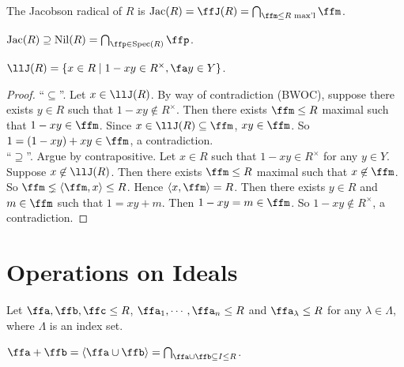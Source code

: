 \begin{definition}
    The Jacobson radical of $R$ is $\operatorname{Jac}(R) = \ffJ(R) = \bigcap_{\ffm \leq R \text{ max'l}}\ffm$.
\end{definition}

\begin{remark}
    $\operatorname{Jac}(R) \supseteq \operatorname{Nil}(R) = \bigcap_{\ffp \in \operatorname{Spec}(R)}\ffp$.
\end{remark}

\begin{proposition}
    $\llJ(R) = \{x \in R \mid 1-xy \in R^\times, \fa y \in Y\}$.
\end{proposition}

\begin{proof}
    ``$\subseteq$''. Let $x \in \llJ(R)$. By way of contradiction (BWOC), suppose there exists $y \in R$ such that $1-xy \not \in R^\times$. Then there exists $\ffm \leq R$ maximal such that $1-xy \in \ffm$. Since $x \in \llJ(R) \subseteq \ffm$, $xy \in \ffm$. So $1 = (1-xy) + xy \in \ffm$, a contradiction. \\
    ``$\supseteq$''. Argue by contrapositive. Let $x \in R$ such that $1-xy \in R^\times$ for any $y \in Y$. Suppose $x \not \in \llJ(R)$. Then there exists $\ffm \leq R$ maximal such that $x \not \in \ffm$. So $\ffm \lneq \langle \ffm, x \rangle \leq R$. Hence $\langle x,\ffm \rangle = R$. Then there exists $y \in R$ and $m \in \ffm$ such that $1 = xy+m$. Then $1-xy = m \in \ffm$. So $1-xy \not \in R^\times$, a contradiction.
\end{proof}

\section{Operations on Ideals}

Let $\ffa,\ffb,\ffc \leq R$, $\ffa_1,\cdots,\ffa_n \leq R$ and $\ffa_\lambda \leq R$ for any $\lambda \in \Lambda$, where $\Lambda$ is an index set.

\begin{definition}
    $\ffa + \ffb = \langle \ffa \cup \ffb \rangle = \bigcap_{\ffa \cup \ffb \subseteq I \leq R}$.
\end{definition}

